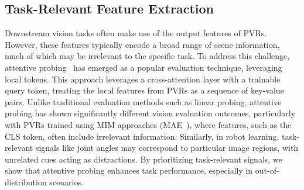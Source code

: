 \subsection{Task-Relevant Feature Extraction}
Downstream vision tasks often make use of the output features of PVRs. 
However, these features typically encode a broad range of scene information, much of which may be irrelevant to the specific task. 
To address this challenge, attentive probing~\cite{Chen2024, danier2024depthcuesevaluatingmonoculardepth, bardes2024revisiting} has emerged as a popular evaluation technique, leveraging local tokens. 
This approach leverages a cross-attention layer with a trainable query token, treating the local features from PVRs as a sequence of key-value pairs. 
Unlike traditional evaluation methods such as linear probing, attentive probing has shown significantly different vision evaluation outcomes, particularly with PVRs trained using MIM approaches (\eg MAE~\cite{He2021MaskedAA}), where features, such as the CLS token, often include irrelevant information.
Similarly, in robot learning, task-relevant signals like joint angles may correspond to particular image regions, with unrelated cues acting as distractions. 
By prioritizing task-relevant signals, we show that attentive probing enhances task performance, especially in out-of-distribution scenarios.